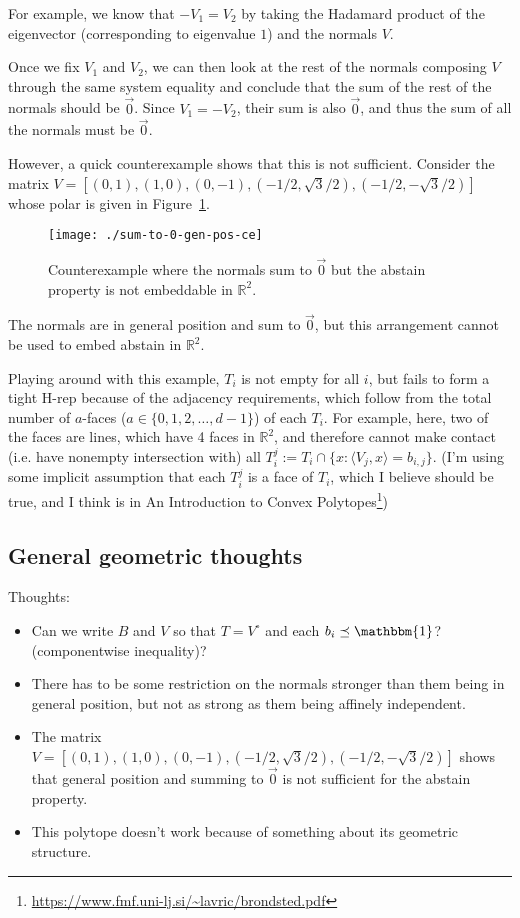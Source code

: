 \documentclass[12pt]{article}
\newcommand{\reals}{\mathbb{R}}
\newcommand{\inprod}[2]{\langle #1, #2 \rangle}
\newcommand{\ones}{\mathbbm{1}}
\begin{document}
    For example, we know that $-V_1 = V_2$ by taking the Hadamard product of the eigenvector (corresponding to eigenvalue $1$) and the normals $V$.
    
    Once we fix $V_1$ and $V_2$, we can then look at the rest of the normals composing $V$ through the same system equality and conclude that the sum of the rest of the normals should be $\vec{0}$.
    Since $V_1 = -V_2$, their sum is also $\vec{0}$, and thus the sum of all the normals must be $\vec{0}$.
    
    However, a quick counterexample shows that this is not sufficient.
    Consider the matrix $V = [(0,1), (1,0), (0,-1), (-1/2, \sqrt{3} / 2), (-1/2, -\sqrt{3} / 2)]$ whose polar is given in Figure~\ref{fig:sum-to-0-gen-pos-ce}.
    
	\begin{figure}
	\centering
	\texttt{[image: ./sum-to-0-gen-pos-ce]}
	\caption{Counterexample where the normals sum to $\vec{0}$ but the abstain property is not embeddable in $\reals^2$.}
	\label{fig:sum-to-0-gen-pos-ce}
	\end{figure}

	The normals are in general position and sum to $\vec{0}$, but this arrangement cannot be used to embed abstain in $\reals^2$.
	
	Playing around with this example, $T_i$ is not empty for all $i$, but fails to form a tight H-rep because of the adjacency requirements, which follow from the total number of $a$-faces ($a \in \{0, 1, 2, \ldots, d-1\}$) of each $T_i$.
	For example, here, two of the faces are lines, which have 4 faces in $\reals^2$, and therefore cannot make contact (i.e. have nonempty intersection with) all $T_i^j := T_i \cap \{x : \inprod{V_j}{x} = b_{i,j} \}$.
	(I'm using some implicit assumption that each $T_i^j$ is a face of $T_i$, which I believe should be true, and I think is in An Introduction to Convex Polytopes\footnote{\url{https://www.fmf.uni-lj.si/~lavric/brondsted.pdf}})
	
	
\subsection*{General geometric thoughts}
Thoughts:
\begin{itemize}
\item Can we write $B$ and $V$ so that $T = V^\circ$ and each $b_i \preceq \ones$? (componentwise inequality)?
\item There has to be some restriction on the normals stronger than them being in general position, but not as strong as them being affinely independent.
\item The matrix $V = [(0,1), (1,0), (0,-1), (-1/2, \sqrt{3} / 2), (-1/2, -\sqrt{3} / 2)]$ shows that general position and summing to $\vec{0}$ is not sufficient for the abstain property.
\item This polytope doesn't work because of something about its geometric structure.
\end{itemize}
\end{document}
